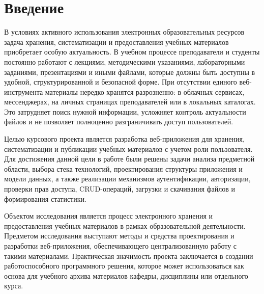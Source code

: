 \section*{Введение}

В условиях активного использования электронных образовательных ресурсов задача хранения, систематизации и предоставления учебных материалов приобретает особую актуальность. В учебном процессе преподаватели и студенты постоянно работают с лекциями, методическими указаниями, лабораторными заданиями, презентациями и иными файлами, которые должны быть доступны в удобной, структурированной и безопасной форме. При отсутствии единого веб-инструмента материалы нередко хранятся разрозненно: в облачных сервисах, мессенджерах, на личных страницах преподавателей или в локальных каталогах. Это затрудняет поиск нужной информации, усложняет контроль актуальности файлов и не позволяет полноценно разграничивать доступ пользователей.

Целью курсового проекта является разработка веб-приложения для хранения, систематизации и публикации учебных материалов с учетом роли пользователя. Для достижения данной цели в работе были решены задачи анализа предметной области, выбора стека технологий, проектирования структуры приложения и модели данных, а также реализации механизмов аутентификации, авторизации, проверки прав доступа, CRUD-операций, загрузки и скачивания файлов и формирования статистики.

Объектом исследования является процесс электронного хранения и предоставления учебных материалов в рамках образовательной деятельности. Предметом исследования выступают методы и средства проектирования и разработки веб-приложения, обеспечивающего централизованную работу с такими материалами. Практическая значимость проекта заключается в создании работоспособного программного решения, которое может использоваться как основа для учебного архива материалов кафедры, дисциплины или отдельного курса.